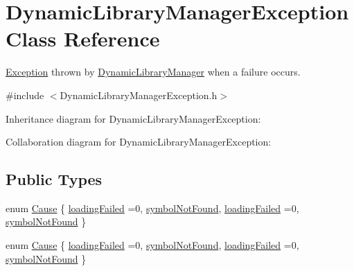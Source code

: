\hypertarget{class_dynamic_library_manager_exception}{\section{Dynamic\+Library\+Manager\+Exception Class Reference}
\label{class_dynamic_library_manager_exception}
}


\hyperlink{class_exception}{Exception} thrown by \hyperlink{class_dynamic_library_manager}{Dynamic\+Library\+Manager} when a failure occurs.  




{\ttfamily \#include $<$Dynamic\+Library\+Manager\+Exception.\+h$>$}



Inheritance diagram for Dynamic\+Library\+Manager\+Exception\+:


Collaboration diagram for Dynamic\+Library\+Manager\+Exception\+:
\subsection*{Public Types}
\begin{DoxyCompactItemize}
\item 
enum \hyperlink{class_dynamic_library_manager_exception_a73b4694c152e0693fbc19fb04987a0b9}{Cause} \{ \hyperlink{class_dynamic_library_manager_exception_a73b4694c152e0693fbc19fb04987a0b9a3f662f59beb63032656481d2b6a73f85}{loading\+Failed} =0, 
\hyperlink{class_dynamic_library_manager_exception_a73b4694c152e0693fbc19fb04987a0b9a611ac80055e32b74c2c846f3f3942424}{symbol\+Not\+Found}, 
\hyperlink{class_dynamic_library_manager_exception_a73b4694c152e0693fbc19fb04987a0b9a3f662f59beb63032656481d2b6a73f85}{loading\+Failed} =0, 
\hyperlink{class_dynamic_library_manager_exception_a73b4694c152e0693fbc19fb04987a0b9a611ac80055e32b74c2c846f3f3942424}{symbol\+Not\+Found}
 \}
\item 
enum \hyperlink{class_dynamic_library_manager_exception_a73b4694c152e0693fbc19fb04987a0b9}{Cause} \{ \hyperlink{class_dynamic_library_manager_exception_a73b4694c152e0693fbc19fb04987a0b9a3f662f59beb63032656481d2b6a73f85}{loading\+Failed} =0, 
\hyperlink{class_dynamic_library_manager_exception_a73b4694c152e0693fbc19fb04987a0b9a611ac80055e32b74c2c846f3f3942424}{symbol\+Not\+Found}, 
\hyperlink{class_dynamic_library_manager_exception_a73b4694c152e0693fbc19fb04987a0b9a3f662f59beb63032656481d2b6a73f85}{loading\+Failed} =0, 
\hyperlink{class_dynamic_library_manager_exception_a73b4694c152e0693fbc19fb04987a0b9a611ac80055e32b74c2c846f3f3942424}{symbol\+Not\+Found}
 \}
\end{DoxyCompactItemize}

